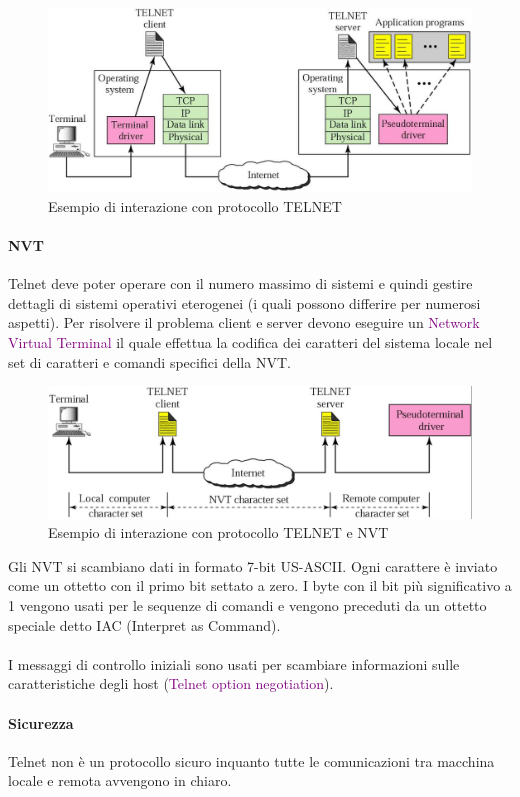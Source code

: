 \begin{figure}[h]
    \centering
    \includegraphics[scale=0.27]{Immagini/Schema_Telnet.png}
    \caption{Esempio di interazione con protocollo TELNET}
\end{figure}

\newblock

\paragraph{NVT} Telnet deve poter operare con il numero massimo di sistemi e quindi gestire dettagli di sistemi operativi eterogenei (i quali possono differire per numerosi aspetti).
Per risolvere il problema client e server devono eseguire un \textcolor{purple}{Network Virtual Terminal} il quale effettua la codifica dei caratteri del sistema locale nel set di caratteri e comandi specifici della NVT.
\begin{figure}[h]
    \centering
    \includegraphics[scale=0.27]{Immagini/Telnet_NVT.png}
    \caption{Esempio di interazione con protocollo TELNET e NVT}
\end{figure}

Gli NVT si scambiano dati in formato 7-bit US-ASCII. Ogni carattere è inviato come un ottetto con il primo bit settato a zero.
I byte con il bit più significativo a 1 vengono usati per le sequenze di comandi e vengono preceduti da un ottetto speciale detto IAC (Interpret as Command).
\\ \\ I messaggi di controllo iniziali sono usati per scambiare informazioni sulle caratteristiche degli host (\textcolor{purple}{Telnet option negotiation}).

\paragraph{Sicurezza} Telnet non è un protocollo sicuro inquanto tutte le comunicazioni tra macchina locale e remota avvengono in chiaro.